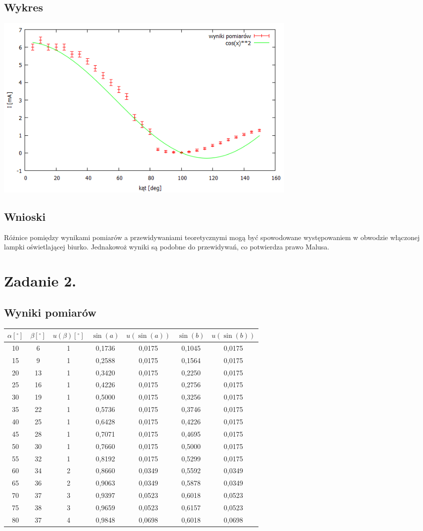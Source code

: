 \documentclass[10pt,a4paper]{article}
\begin{document}
\subsection{Wykres}
\includegraphics[width=15cm]{iodkat.png}
\subsection{Wnioski}
Różnice pomiędzy wynikami pomiarów a przewidywaniami teoretycznymi mogą być spowodowane występowaniem w obwodzie włączonej lampki oświetlającej biurko. Jednakowoż wyniki są podobne do przewidywań, co potwierdza prawo Malusa.
\section{Zadanie 2.}
\subsection{Wyniki pomiarów}
\begin{tabular}{|c|c|c|c|c|c|c|}
$\alpha[^\circ]$ & $\beta[^\circ]$ & $u(\beta)[^\circ]$ & $\sin(a)$ & $u(\sin(a))$ & $\sin(b)$ & $u(\sin(b))$ \\\hline
10 & 6 & 1 & 0,1736 & 0,0175 & 0,1045 & 0,0175\\
15 & 9 & 1 & 0,2588 & 0,0175 & 0,1564 & 0,0175\\
20 & 13 & 1 & 0,3420 & 0,0175 & 0,2250 & 0,0175\\
25 & 16 & 1 & 0,4226 & 0,0175 & 0,2756 & 0,0175\\
30 & 19 & 1 & 0,5000 & 0,0175 & 0,3256 & 0,0175\\
35 & 22 & 1 & 0,5736 & 0,0175 & 0,3746 & 0,0175\\
40 & 25 & 1 & 0,6428 & 0,0175 & 0,4226 & 0,0175\\
45 & 28 & 1 & 0,7071 & 0,0175 & 0,4695 & 0,0175\\
50 & 30 & 1 & 0,7660 & 0,0175 & 0,5000 & 0,0175\\
55 & 32 & 1 & 0,8192 & 0,0175 & 0,5299 & 0,0175\\
60 & 34 & 2 & 0,8660 & 0,0349 & 0,5592 & 0,0349\\
65 & 36 & 2 & 0,9063 & 0,0349 & 0,5878 & 0,0349\\
70 & 37 & 3 & 0,9397 & 0,0523 & 0,6018 & 0,0523\\
75 & 38 & 3 & 0,9659 & 0,0523 & 0,6157 & 0,0523\\
80 & 37 & 4 & 0,9848 & 0,0698 & 0,6018 & 0,0698\\
\end{tabular}
\end{document}
